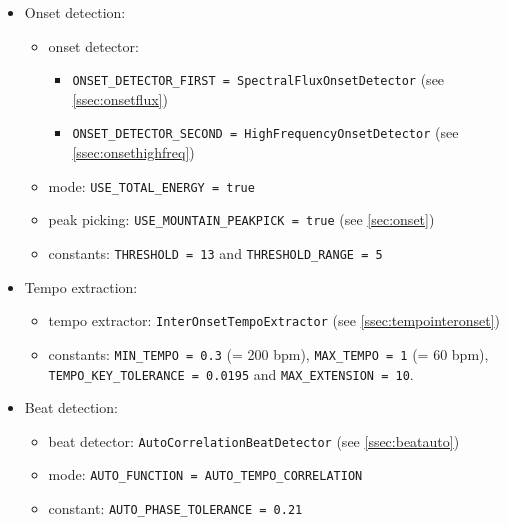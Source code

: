 \begin{itemize}
  \item Onset detection:
  \begin{itemize}
    \item onset detector:
    \begin{itemize}
      \item \texttt{ONSET\_DETECTOR\_FIRST = SpectralFluxOnsetDetector} (see
    \ref{ssec:onsetflux})
      \item \texttt{ONSET\_DETECTOR\_SECOND = HighFrequencyOnsetDetector} (see
    \ref{ssec:onsethighfreq})
    \end{itemize}
    \item mode: \texttt{USE\_TOTAL\_ENERGY = true}
    \item peak picking: \texttt{USE\_MOUNTAIN\_PEAKPICK = true} (see
    \ref{sec:onset})
    \item constants: \texttt{THRESHOLD = 13} and \texttt{THRESHOLD\_RANGE = 5}
  \end{itemize}
  \item Tempo extraction:
  \begin{itemize}
    \item tempo extractor: \texttt{InterOnsetTempoExtractor} (see
    \ref{ssec:tempointeronset})
    \item constants: \texttt{MIN\_TEMPO = 0.3} (= 200 bpm), \texttt{MAX\_TEMPO =
    1} (= 60 bpm), \texttt{TEMPO\_KEY\_TOLERANCE = 0.0195} and
    \texttt{MAX\_EXTENSION = 10}.
  \end{itemize}
  \item Beat detection:
  \begin{itemize}
    \item beat detector: \texttt{AutoCorrelationBeatDetector} (see
    \ref{ssec:beatauto})
    \item mode: \texttt{AUTO\_FUNCTION = AUTO\_TEMPO\_CORRELATION}
    \item constant: \texttt{AUTO\_PHASE\_TOLERANCE = 0.21}
  \end{itemize}
\end{itemize}